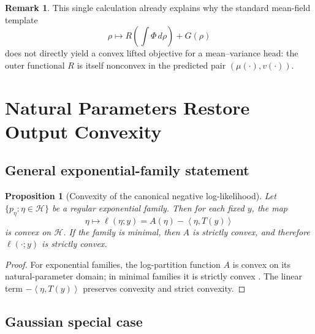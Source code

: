 \documentclass[11pt]{article}
\newtheorem{proposition}[theorem]{Proposition}
\theoremstyle{definition}
\newtheorem{remark}[theorem]{Remark}
\newcommand{\ip}[2]{\left\langle #1, #2 \right\rangle}
\newcommand{\mc}[1]{\mathcal{#1}}
\begin{document}
\begin{remark}
This single calculation already explains why the standard mean-field template
\[
  \rho \mapsto R\!\left(\int \Phi\,d\rho\right) + G(\rho)
\]
does not directly yield a convex lifted objective for a mean--variance head:
the outer functional $R$ is itself nonconvex in the predicted pair
$(\mu(\cdot),v(\cdot))$.
\end{remark}

\section{Natural Parameters Restore Output Convexity}
\label{sec:natural-convexity}

\subsection{General exponential-family statement}

\begin{proposition}[Convexity of the canonical negative log-likelihood]
\label{prop:expfam-convexity}
Let $\{p_\eta:\eta\in \mc{H}\}$ be a regular exponential family. Then for each
fixed $y$, the map
\begin{equation}
  \eta \mapsto \ell(\eta;y) = A(\eta) - \ip{\eta}{T(y)}
\end{equation}
is convex on $\mc{H}$. If the family is minimal, then $A$ is strictly convex,
and therefore $\ell(\cdot;y)$ is strictly convex.
\end{proposition}

\begin{proof}
For exponential families, the log-partition function $A$ is convex on its
natural-parameter domain; in minimal families it is strictly convex
\cite{WainwrightJordan2008}. The linear term $-\ip{\eta}{T(y)}$ preserves
convexity and strict convexity.
\end{proof}

\subsection{Gaussian special case}
\end{document}
